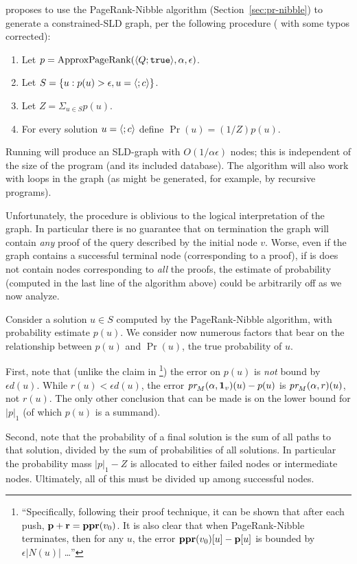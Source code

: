 \documentclass{article} %
\begin{document}
\cite[Sec 3.2]{Cohen-2015} proposes to use the PageRank-Nibble algorithm (Section~\ref{sec:pr-nibble}) to generate a constrained-SLD graph, per the following procedure (\cite[Table 4]{Cohen-2015} with some typos corrected):
\begin{enumerate}
\item Let $p = \mbox{ApproxPageRank}(\langle Q;\mbox{\tt true}\rangle,\alpha,\epsilon)$.
\item Let $S=\{ u : p(u) > \epsilon, u=\langle;c\rangle\}$.
\item Let $Z=\Sigma_{u\in S} p(u)$.
\item For every solution $u=\langle;c\rangle$ define $\Pr(u)=(1/Z) p(u)$.
\end{enumerate}
Running \APR{} will produce an SLD-graph with $O(1/\alpha\epsilon)$ nodes; this is independent of the size of the program (and its included database). The algorithm will also work with loops in the graph (as might be generated, for example, by recursive programs). 

Unfortunately, the procedure is oblivious to the logical interpretation of the graph. In particular there is no guarantee that on termination the graph will contain {\em any} proof of the query described by the initial node $v$. Worse, even if the graph contains a successful terminal node (corresponding to a proof), if is does not contain nodes corresponding to {\em all} the proofs, the estimate of probability (computed in the last line of the algorithm above) could be arbitrarily off as we now analyze.


Consider a solution $u\in S$ computed by the PageRank-Nibble algorithm, with probability estimate $p(u)$. We consider now numerous factors that bear on the relationship between $p(u)$ and $\Pr(u)$, the true probability of $u$. 

First, note that (unlike the claim in \cite{Cohen-2015}\footnote{\cite[Sec 2.2]{Cohen-2015} ``Specifically, following their proof technique, it can be shown that after each push, ${\bf p} + {\bf r}={\bf ppr}(v_0)$. It is also clear that when PageRank-Nibble terminates, then for any $u$, the error ${\bf ppr}(v_0)[u]-{\bf p}[u]$  is bounded by $\epsilon |N(u)|$ \ldots''}) the error on $p(u)$ is {\em not} bound by $\epsilon d(u)$. While $r(u) < \epsilon d(u)$, the error $\mbox{\em pr}_M(\alpha,{\bf 1}_v)(u)- p(u)$ is $\mbox{\em pr}_M(\alpha,r)(u)$, not $r(u)$.  The only other conclusion that can be made is on the lower bound for $|p|_1$ (of which $p(u)$ is a summand). 

Second, note that the probability of a final solution is the sum of all paths to that solution, divided by the sum of probabilities of all solutions. In particular the probability mass $|p|_1 - Z$ is allocated to either failed nodes or intermediate nodes. Ultimately, all of this must be divided up among successful nodes.
\end{document}
